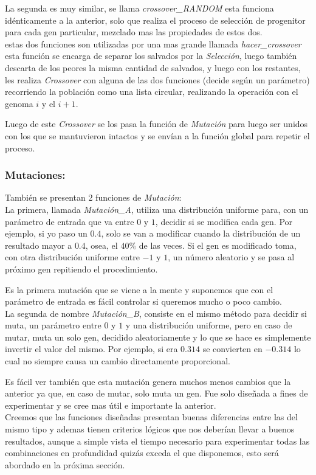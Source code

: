 La segunda es muy similar, se llama \emph{crossover\_RANDOM} esta funciona idénticamente a la anterior, solo que realiza el proceso
de selección de progenitor para cada gen particular, mezclado mas las propiedades de estos dos.\\

estas dos funciones son utilizadas por una mas grande llamada \emph{hacer\_crossover} esta función se encarga de separar los salvados
por la \emph{Selección}, luego también descarta de los peores la misma cantidad de salvados, y luego con los restantes, les realiza
\emph{Crossover} con alguna de las dos funciones (decide según un parámetro) recorriendo la población como una lista circular,
realizando la operación con el genoma $i$ y el $i+1$.

Luego de este \emph{Crossover} se los pasa la función de \emph{Mutación} para luego ser unidos con los que se mantuvieron
intactos y se envían a la función global para repetir el proceso.


\subsubsection{Mutaciones:}

También se presentan 2 funciones de \emph{Mutación}:\\

La primera, llamada \emph{Mutación\_A}, utiliza una distribución uniforme para, con un parámetro de entrada que va entre $0$ y $1$,
decidir si se modifica cada gen. Por ejemplo, si yo paso un $0.4$, solo se van a modificar cuando
la distribución de un resultado mayor a $0.4$, osea, el $40\%$ de las veces. Si el gen es modificado toma,
con otra distribución uniforme entre $-1$ y $1$, un número aleatorio y se pasa al próximo gen repitiendo
el procedimiento.


Es la primera mutación que se viene a la mente y suponemos que con el parámetro de entrada es fácil controlar si queremos
mucho o poco cambio.\\

La segunda de nombre \emph{Mutación\_B}, consiste en el mismo método para decidir si muta, un parámetro entre $0$ y $1$
y una distribución uniforme, pero en caso de mutar, muta un solo gen, decidido aleatoriamente y lo que se hace es simplemente
invertir el valor del mismo. Por ejemplo, si era $0.314$ se convierten en $-0.314$ lo cual no siempre causa un cambio
directamente proporcional.

Es fácil ver también que esta mutación genera muchos menos cambios que la anterior ya que, en caso de mutar, solo muta un gen.
Fue solo diseñada a fines de experimentar y se cree mas útil e importante la anterior.
\\

Creemos que las funciones diseñadas presentan buenas diferencias entre las del mismo tipo y ademas tienen criterios lógicos que
nos deberían llevar a buenos resultados, aunque a simple vista el tiempo necesario para experimentar todas las combinaciones
 en profundidad quizás exceda el que disponemos, esto será abordado en la próxima sección.
